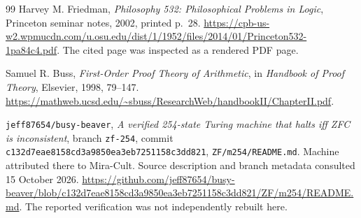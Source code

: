 \documentclass[11pt,letterpaper]{article}
\theoremstyle{definition}\newtheorem{definition}[theorem]{Definition}
\theoremstyle{remark}\newtheorem{remark}[theorem]{Remark}
\begin{document}
\begin{thebibliography}{99}
Harvey M. Friedman, \emph{Philosophy 532: Philosophical Problems in Logic},
Princeton seminar notes, 2002, printed p.~28.
\url{https://cpb-us-w2.wpmucdn.com/u.osu.edu/dist/1/1952/files/2014/01/Princeton532-1pa84c4.pdf}.
The cited page was inspected as a rendered PDF page.

Samuel R. Buss, \emph{First-Order Proof Theory of Arithmetic}, in
\emph{Handbook of Proof Theory}, Elsevier, 1998, 79--147.
\url{https://mathweb.ucsd.edu/~sbuss/ResearchWeb/handbookII/ChapterII.pdf}.

\texttt{jeff87654/busy-beaver}, \emph{A verified 254-state Turing machine
that halts iff ZFC is inconsistent}, branch \texttt{zf-254}, commit
\texttt{c132d7eae8158cd3a9850ea3eb7251158c3dd821},
\texttt{ZF/m254/README.md}. Machine attributed there to Mira-Cult.
Source description and branch metadata consulted 15 October 2026.
\url{https://github.com/jeff87654/busy-beaver/blob/c132d7eae8158cd3a9850ea3eb7251158c3dd821/ZF/m254/README.md}.
The reported verification was not independently rebuilt here.

\end{thebibliography}
\end{document}
